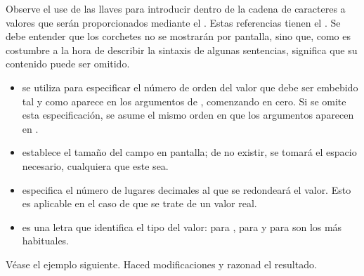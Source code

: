 \documentclass[letterpaper,10pt,english]{sphinxmanual}
\begin{document}
Observe el use de las llaves \sphinxcode{\sphinxupquote{\{\}}} para introducir dentro de la cadena de caracteres  a valores que serán proporcionados mediante el  . Estas referencias tienen el  . Se debe entender que los corchetes no se mostrarán por pantalla, sino que, como es costumbre a la hora de describir la sintaxis de algunas sentencias, significa que su contenido puede ser omitido.
\begin{itemize}
\item {} 
 se utiliza para especificar el número de orden del valor que debe ser embebido tal y como aparece en los argumentos de , comenzando en cero.
Si se omite esta especificación, se asume el mismo orden en que los argumentos aparecen en .

\item {} 
 establece el tamaño del campo en pantalla; de no existir, se tomará el espacio necesario, cualquiera que este sea.

\item {} 
 especifica el número de lugares decimales al que se redondeará el valor. Esto es aplicable  en el caso de que se trate de un valor real.

\item {} 
 es una letra que identifica el tipo del valor:  para ,  para  y  para  son los más habituales.

\end{itemize}

Véase el ejemplo siguiente. Haced modificaciones y razonad el resultado.

\begin{sphinxVerbatim}[commandchars=\\\{\}]
\end{sphinxVerbatim}
\end{document}
